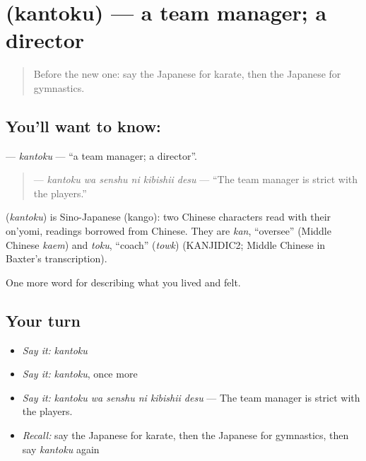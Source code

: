 \section[\texorpdfstring{\ja{かんとく} (kantoku)}{かんとく (kantoku)}]{ (kantoku) — a team manager; a director}

\label{lesson:JA-C461-kantoku}



\begin{quote}
Before the new one: say the Japanese for karate, then the Japanese for gymnastics.
\end{quote}

\subsection*{You'll want to know: }
\textbf{} — \emph{kantoku} — \textquotedblleft{}a team manager; a director\textquotedblright{}.

\begin{quote}
\textbf{  } — \emph{kantoku wa senshu ni kibishii desu} — \textquotedblleft{}The team manager is strict with the players.\textquotedblright{}
\end{quote}

\begin{cousinweb}
\textbf{} (\emph{kantoku}) is Sino-Japanese (kango): two Chinese characters read with their on'yomi, readings borrowed from Chinese. They are \emph{kan}, \textquotedblleft{}oversee\textquotedblright{} (Middle Chinese \emph{kaem}) and \emph{toku}, \textquotedblleft{}coach\textquotedblright{} (\emph{towk}) (KANJIDIC2; Middle Chinese in Baxter's transcription).
\end{cousinweb}

\begin{grammarlens}[title={What you've built}]
One more word for describing what you lived and felt.
\end{grammarlens}

\subsection*{Your turn}
\begin{itemize}
\raggedright
  \item \emph{Say it:} \emph{kantoku}
  \item \emph{Say it:} \emph{kantoku}, once more
  \item \emph{Say it:} \emph{kantoku wa senshu ni kibishii desu} — The team manager is strict with the players.
  \item \emph{Recall:} say the Japanese for karate, then the Japanese for gymnastics, then say \emph{kantoku} again
\end{itemize}

